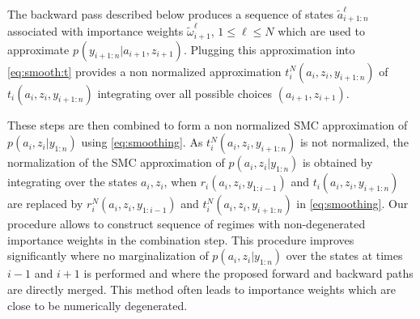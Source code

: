 
The backward pass described below produces a sequence of states $\tilde{a}_{i+1:n}^{\ell}$ associated with importance weights $\tilde{\omega}_{i+1}^{\ell}$, $1\le \ell\le N$ which are used to approximate $p_{}(y_{i+1:n}|a_{i+1},z_{i+1})$. Plugging this approximation into \eqref{eq:smooth:t} provides a non normalized approximation $t^N_{i}(a_i,z_i,y_{i+1:n})$ of $t_{i}(a_i,z_i,y_{i+1:n})$ integrating over all possible choices $(a_{i+1},z_{i+1})$.


These steps are then combined to form a non normalized SMC approximation of $p(a_{i},z_{i}|y_{1:n})$ using \eqref{eq:smoothing}. As $t^N_{i}(a_i,z_i,y_{i+1:n})$ is not normalized, the normalization of the SMC approximation of $p(a_{i},z_{i}|y_{1:n})$ is obtained by integrating over the states $a_{i},z_{i}$, when $r_{i}(a_{i},z_{i},y_{1:i-1})$ and $t_{i}(a_i,z_i,y_{i+1:n})$ are replaced by $r^N_{i}(a_{i},z_{i},y_{1:i-1})$ and $t^N_{i}(a_i,z_i,y_{i+1:n})$ in \eqref{eq:smoothing}. %
Our procedure allows to construct sequence of regimes with non-degenerated importance weights in the combination step. This procedure improves significantly \cite{briers:doucet:maskell:2010} where no marginalization of $p(a_{i},z_{i}|y_{1:n})$ over the states at times $i-1$ and $i+1$ is performed and where the proposed forward and backward paths are directly merged. This method often leads to importance weights which are close to be numerically degenerated.

